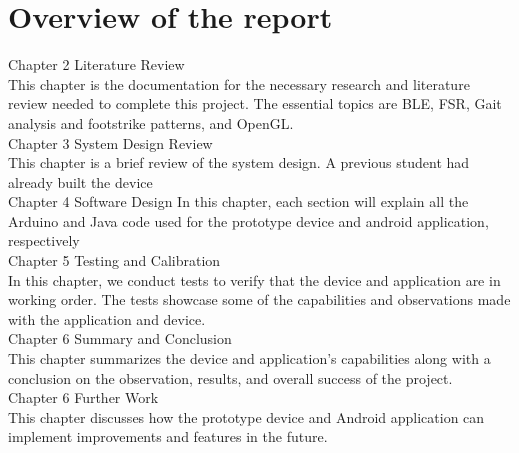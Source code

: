 \section{Overview of the report}

Chapter 2 Literature Review\\
This chapter is the documentation for the necessary research and literature review needed to complete this project. The essential topics are BLE, FSR, Gait analysis and footstrike patterns, and OpenGL.\\
Chapter 3 System Design Review\\
This chapter is a brief review of the system design. A previous student had already built the device\\
Chapter 4 Software Design
In this chapter, each section will explain all the Arduino and Java code used for the prototype device and android application, respectively\\
Chapter 5 Testing and Calibration\\
In this chapter, we conduct tests to verify that the device and application are in working order. The tests showcase some of the capabilities and observations made with the application and device. \\
Chapter 6 Summary and Conclusion\\
This chapter summarizes the device and application's capabilities along with a conclusion on the observation, results, and overall success of the project.\\
Chapter 6 Further Work\\
This chapter discusses how the prototype device and Android application can implement improvements and features in the future.






